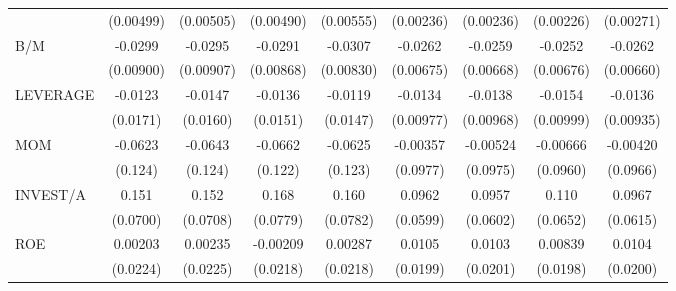 \begin{table}[htbp]
\begin{tabular}{l*{8}{c}}
                    &   (0.00499)         &   (0.00505)         &   (0.00490)         &   (0.00555)         &   (0.00236)         &   (0.00236)         &   (0.00226)         &   (0.00271)         \\
B/M                 &     -0.0299\sym{***}&     -0.0295\sym{***}&     -0.0291\sym{***}&     -0.0307\sym{***}&     -0.0262\sym{***}&     -0.0259\sym{***}&     -0.0252\sym{***}&     -0.0262\sym{***}\\
                    &   (0.00900)         &   (0.00907)         &   (0.00868)         &   (0.00830)         &   (0.00675)         &   (0.00668)         &   (0.00676)         &   (0.00660)         \\
LEVERAGE            &     -0.0123         &     -0.0147         &     -0.0136         &     -0.0119         &     -0.0134         &     -0.0138         &     -0.0154         &     -0.0136         \\
                    &    (0.0171)         &    (0.0160)         &    (0.0151)         &    (0.0147)         &   (0.00977)         &   (0.00968)         &   (0.00999)         &   (0.00935)         \\
MOM                 &     -0.0623         &     -0.0643         &     -0.0662         &     -0.0625         &    -0.00357         &    -0.00524         &    -0.00666         &    -0.00420         \\
                    &     (0.124)         &     (0.124)         &     (0.122)         &     (0.123)         &    (0.0977)         &    (0.0975)         &    (0.0960)         &    (0.0966)         \\
INVEST/A            &       0.151\sym{*}  &       0.152\sym{*}  &       0.168\sym{*}  &       0.160\sym{*}  &      0.0962         &      0.0957         &       0.110         &      0.0967         \\
                    &    (0.0700)         &    (0.0708)         &    (0.0779)         &    (0.0782)         &    (0.0599)         &    (0.0602)         &    (0.0652)         &    (0.0615)         \\
ROE                 &     0.00203         &     0.00235         &    -0.00209         &     0.00287         &      0.0105         &      0.0103         &     0.00839         &      0.0104         \\
                    &    (0.0224)         &    (0.0225)         &    (0.0218)         &    (0.0218)         &    (0.0199)         &    (0.0201)         &    (0.0198)         &    (0.0200)         \\

\end{tabular}
\end{table}
